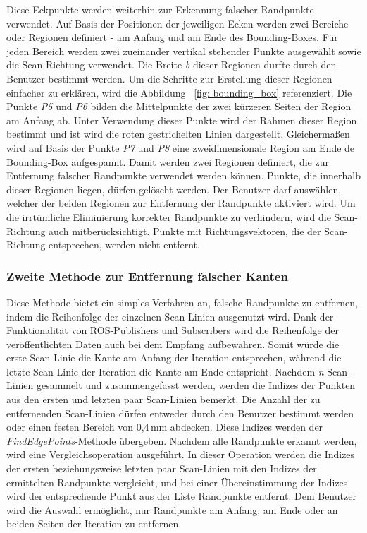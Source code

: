 Diese Eckpunkte werden weiterhin zur Erkennung falscher Randpunkte verwendet. Auf Basis der Positionen der jeweiligen Ecken werden zwei Bereiche oder Regionen definiert - am Anfang und am Ende des Bounding-Boxes. Für jeden Bereich werden zwei zueinander vertikal stehender Punkte ausgewählt sowie die Scan-Richtung verwendet. Die Breite \textit{b} dieser Regionen durfte durch den Benutzer bestimmt werden. Um die Schritte zur Erstellung dieser Regionen einfacher zu erklären, wird die Abbildung ~\ref{fig: bounding_box} referenziert. Die Punkte \textit{P5} und \textit{P6} bilden die Mittelpunkte der zwei kürzeren Seiten der Region am Anfang ab. Unter Verwendung dieser Punkte wird der Rahmen dieser Region bestimmt und ist wird die roten gestrichelten Linien dargestellt. Gleichermaßen wird auf Basis der Punkte \textit{P7} und \textit{P8} eine zweidimensionale Region am Ende de Bounding-Box aufgespannt. Damit werden zwei Regionen definiert, die zur Entfernung falscher Randpunkte verwendet werden können. Punkte, die innerhalb dieser Regionen liegen, dürfen gelöscht werden. Der Benutzer darf auswählen, welcher der beiden Regionen zur Entfernung der Randpunkte aktiviert wird. Um die irrtümliche Eliminierung korrekter Randpunkte zu verhindern, wird die Scan-Richtung auch mitberücksichtigt. Punkte mit Richtungsvektoren, die der Scan-Richtung entsprechen, werden nicht entfernt. 


\subsubsection{Zweite Methode zur Entfernung falscher Kanten}
Diese Methode bietet ein simples Verfahren an, falsche Randpunkte zu entfernen, indem die Reihenfolge der einzelnen Scan-Linien ausgenutzt wird. Dank der Funktionalität von ROS-Publishers und Subscribers wird die Reihenfolge der veröffentlichten Daten auch bei dem Empfang aufbewahren. Somit würde die erste Scan-Linie die Kante am Anfang der Iteration entsprechen, während die letzte Scan-Linie der Iteration die Kante am Ende entspricht. Nachdem \textit{n} Scan-Linien gesammelt und zusammengefasst werden, werden die Indizes der Punkten aus den ersten und letzten paar Scan-Linien bemerkt. Die Anzahl der zu entfernenden Scan-Linien dürfen entweder durch den Benutzer bestimmt werden oder einen festen Bereich von 0,4\,mm abdecken. Diese Indizes werden der \textit{FindEdgePoints}-Methode übergeben. Nachdem alle Randpunkte erkannt werden, wird eine Vergleichsoperation ausgeführt. In dieser Operation werden die Indizes der ersten beziehungsweise letzten paar Scan-Linien mit den Indizes der ermittelten Randpunkte vergleicht, und bei einer Übereinstimmung der Indizes wird der entsprechende Punkt aus der Liste Randpunkte entfernt. Dem Benutzer wird die Auswahl ermöglicht, nur Randpunkte am Anfang, am Ende oder an beiden Seiten der Iteration zu entfernen.

